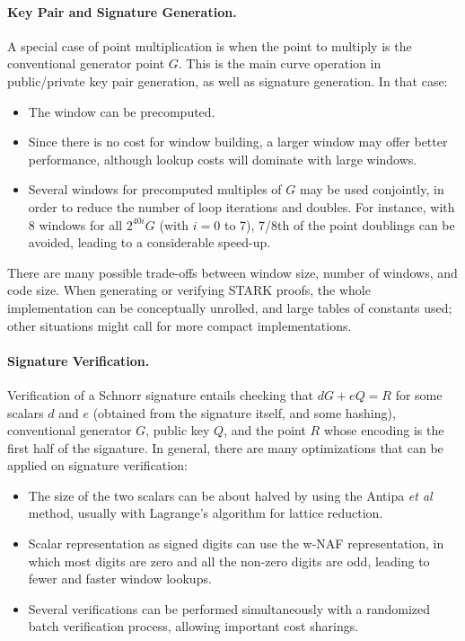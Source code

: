 \documentclass{llncs}
\begin{document}
\paragraph{Key Pair and Signature Generation.} A special case of point
multiplication is when the point to multiply is the conventional
generator point $G$. This is the main curve operation in public/private
key pair generation, as well as signature generation. In that case:
\begin{itemize}

    \item The window can be precomputed.

    \item Since there is no cost for window building, a larger window
    may offer better performance, although lookup costs will dominate
    with large windows.

    \item Several windows for precomputed multiples of $G$ may be used
    conjointly, in order to reduce the number of loop iterations and
    doubles. For instance, with 8 windows for all $2^{40i} G$ (with
    $i = 0$ to 7), 7/8th of the point doublings can be avoided,
    leading to a considerable speed-up.

\end{itemize}

There are many possible trade-offs between window size, number of
windows, and code size. When generating or verifying STARK proofs, the
whole implementation can be conceptually unrolled, and large tables of
constants used; other situations might call for more compact
implementations.

\paragraph{Signature Verification.} Verification of a Schnorr signature
entails checking that $d G + e Q = R$ for some scalars $d$ and $e$
(obtained from the signature itself, and some hashing), conventional
generator $G$, public key $Q$, and the point $R$ whose encoding is the
first half of the signature. In general, there are many optimizations
that can be applied on signature verification:
\begin{itemize}

    \item The size of the two scalars can be about halved by using the
    Antipa \emph{et al} method\cite{AntBroGalLamStrVan2005}, usually
    with Lagrange's algorithm for lattice reduction\cite{Por2020-2}.

    \item Scalar representation as signed digits can use the w-NAF
    representation, in which most digits are zero and all the non-zero
    digits are odd, leading to fewer and faster window lookups.

    \item Several verifications can be performed simultaneously with
    a randomized batch verification process, allowing important cost
    sharings.

\end{itemize}
\end{document}
